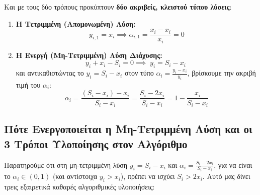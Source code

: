 \documentclass[11pt, a4paper]{article}
\begin{document}
Και με τους δύο τρόπους προκύπτουν \textbf{δύο ακριβείς, κλειστού τύπου λύσεις}:
\begin{enumerate}
    \item \textbf{Η Τετριμμένη (Απομονωμένη) Λύση:}
    \[
    y_{i,1} = x_i \implies \alpha_{i,1} = \frac{x_i - x_i}{x_i} = 0
    \]
    \item \textbf{Η Ενεργή (Μη-Τετριμμένη) Λύση Διάχυσης:}
    \[
    y_i + x_i - S_i = 0 \implies \boxed{\;y_i = S_i - x_i\;}
    \]
    και αντικαθιστώντας το $y_i = S_i - x_i$ στον τύπο $\alpha_i = \frac{y_i - x_i}{y_i}$, βρίσκουμε την ακριβή τιμή του $\alpha_i$:
    \[
    \boxed{\;\alpha_i = \frac{(S_i - x_i) - x_i}{S_i - x_i} = \frac{S_i - 2x_i}{S_i - x_i} = 1 - \frac{x_i}{S_i - x_i}\;}
    \]
\end{enumerate}

\subsection{Πότε Ενεργοποιείται η Μη-Τετριμμένη Λύση και οι 3 Τρόποι Υλοποίησης στον Αλγόριθμο}

Παρατηρούμε ότι στη μη-τετριμμένη λύση $y_i = S_i - x_i$ και $\alpha_i = \frac{S_i - 2x_i}{S_i - x_i}$, για να είναι το $\alpha_i \in (0, 1)$ (και αντίστοιχα $y_i > x_i$), πρέπει να ισχύει $S_i > 2x_i$. Αυτό μας δίνει τρεις εξαιρετικά καθαρές αλγοριθμικές υλοποιήσεις:
\end{document}
